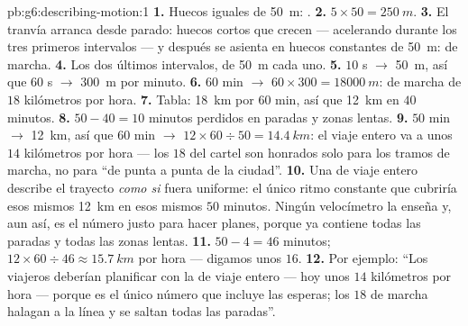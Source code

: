 \begin{solution}{pb:g6:describing-motion:1}
\textbf{1.} Huecos iguales de \qty{50}{m}: .
\textbf{2.} $5 \times 50 = \qty{250}{m}$.
\textbf{3.} El tranvía arranca desde parado: huecos cortos que crecen
--- acelerando durante los tres primeros intervalos --- y después se
asienta en huecos constantes de \qty{50}{m}:  de marcha.
\textbf{4.} Los dos últimos intervalos, de \qty{50}{m} cada uno.
\textbf{5.} $10$ s $\to$ \qty{50}{m}, así que $60$ s $\to$
\qty{300}{m} por minuto.
\textbf{6.} $60$ min $\to$ $60 \times 300 = \qty{18000}{m}$:
 de marcha de $18$ kilómetros por hora.
\textbf{7.} Tabla: \qty{18}{km} por $60$ min, así que \qty{12}{km} en
$40$ minutos.
\textbf{8.} $50 - 40 = 10$ minutos perdidos en paradas y zonas
lentas.
\textbf{9.} $50$ min $\to$ \qty{12}{km}, así que $60$ min $\to$
$12 \times 60 \div 50 = \qty{14.4}{km}$: el viaje entero va a unos
$14$ kilómetros por hora --- los $18$ del cartel son honrados solo
para los tramos de marcha, no para ``de punta a punta de la ciudad''.
\textbf{10.} Una  de viaje entero describe el trayecto
\emph{como si} fuera uniforme: el único ritmo constante que cubriría
esos mismos \qty{12}{km} en esos mismos $50$ minutos. Ningún
velocímetro la enseña y, aun así, es el número justo para hacer
planes, porque ya contiene todas las paradas y todas las zonas lentas.
\textbf{11.} $50 - 4 = 46$ minutos;
$12 \times 60 \div 46 \approx \qty{15.7}{km}$ por hora --- digamos
unos $16$.
\textbf{12.} Por ejemplo: ``Los viajeros deberían planificar con la
 de viaje entero --- hoy unos $14$ kilómetros por hora ---
porque es el único número que incluye las esperas; los $18$ de marcha
halagan a la línea y se saltan todas las paradas''.
\end{solution}
